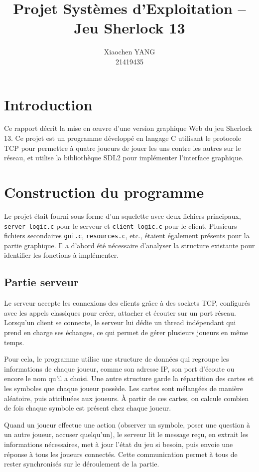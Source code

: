 \documentclass{article}
\title{Projet Systèmes d'Exploitation -- Jeu Sherlock 13}
\author{Xiaochen YANG\\21419435}
\date{}
\begin{document}
\maketitle

\section*{Introduction}

Ce rapport décrit la mise en œuvre d'une version graphique Web du jeu Sherlock 13. Ce projet est un programme développé 
en langage C utilisant le protocole TCP pour permettre à quatre joueurs de jouer les uns contre les autres sur le réseau, et utilise la bibliothèque SDL2 pour implémenter l'interface graphique.

\section{Construction du programme}

Le projet était fourni sous forme d'un squelette avec deux fichiers principaux, \texttt{server\_logic.c} pour le serveur et \texttt{client\_logic.c} pour le client.
Plusieurs fichiers secondaires \texttt{gui.c}, \texttt{resources.c}, etc., étaient également présents pour la partie graphique. 
Il a d'abord été nécessaire d'analyser la structure existante pour identifier les fonctions à implémenter.

\subsection{Partie serveur}

Le serveur accepte les connexions des clients grâce à des sockets TCP, configurés avec les appels classiques pour créer, attacher et écouter sur un port réseau. 
Lorsqu'un client se connecte, le serveur lui dédie un thread indépendant qui prend en charge ses échanges, ce qui permet de gérer plusieurs joueurs en même temps.

Pour cela, le programme utilise une structure de données qui regroupe les informations de chaque joueur, 
comme son adresse IP, son port d'écoute ou encore le nom qu'il a choisi. Une autre structure garde la répartition des cartes et les symboles que chaque joueur possède. 
Les cartes sont mélangées de manière aléatoire, puis attribuées aux joueurs. À partir de ces cartes, on calcule combien de fois chaque symbole est présent chez chaque joueur.

Quand un joueur effectue une action (observer un symbole, poser une question à un autre joueur, accuser quelqu'un), 
le serveur lit le message reçu, en extrait les informations nécessaires, met à jour l'état du jeu si besoin, 
puis envoie une réponse à tous les joueurs connectés. Cette communication permet à tous de rester synchronisés sur le déroulement de la partie.
\end{document}
